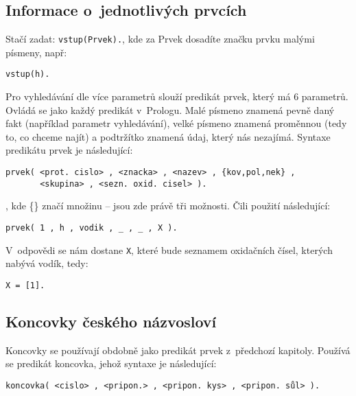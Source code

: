 \documentclass[a4paper]{article}
\begin{document}
\subsection{Informace o~jednotlivých prvcích}
Stačí zadat: \texttt{vstup(Prvek).}, kde za Prvek dosadíte značku prvku malými písmeny, např:
\begin{verbatim}
vstup(h).
\end{verbatim}
Pro vyhledávání dle více parametrů slouží predikát prvek, který má 6 parametrů. Ovládá se jako každý predikát v~Prologu. Malé písmeno znamená pevně daný fakt (například parametr vyhledávání), velké písmeno znamená proměnnou (tedy to, co chceme najít) a podtržítko znamená údaj, který nás nezajímá. Syntaxe predikátu prvek je následující:
\begin{verbatim}
prvek( <prot. cislo> , <znacka> , <nazev> , {kov,pol,nek} , 
	   <skupina> , <sezn. oxid. cisel> ). 
\end{verbatim}
, kde \{\} značí množinu -- jsou zde právě tři možnosti. Čili použití následující:
\begin{verbatim}
prvek( 1 , h , vodik , _ , _ , X ).
\end{verbatim}
V~odpovědi se nám dostane \texttt{X}, které bude seznamem oxidačních čísel, kterých nabývá vodík, tedy:
\begin{verbatim}
X = [1].
\end{verbatim}

\subsection{Koncovky českého názvosloví}
Koncovky se používají obdobně jako predikát prvek z~předchozí kapitoly. Používá se predikát koncovka, jehož syntaxe je následující:
\begin{verbatim}
koncovka( <cislo> , <pripon.> , <pripon. kys> , <pripon. sůl> ).
\end{verbatim}
\end{document}
